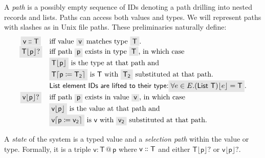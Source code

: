 \documentclass[english,submission]{programming}
\makeatletter
\newcommand{\mathbox}[1]{\colorbox{black!10}{$#1$}}
\DeclareMathOperator{\at}{\textsf{@}}
\makeatother
\begin{document}
A \textit{path} is a possibly empty sequence of IDs denoting a path drilling into nested records and lists. Paths can access both values and types. We will represent paths with slashes as in Unix file paths.
These preliminaries naturally define:
\[ \begin{array}{cl}
  \mathbox{\textsf{v} \dblcolon \textsf{T}} & \textrm{iff value \mathbox{\textsf{v}} matches type \mathbox{\textsf{T}}}.\\

  \mathbox{\textsf{T}\lfloor\textsf{p}\rfloor?} & \textrm{iff path \mathbox{\textsf{p}} exists in type \mathbox{\textsf{T}}} \textrm{, in which case}\\
  & \mathbox{\textsf{T}\lfloor\textsf{p}\rfloor} \textrm{ is the type at that path and }\\
  & \mathbox{\textsf{T}\lceil\textsf{p} \coloneqq \textsf{T}_\textsf{2}\rceil} \textrm{ is \textsf{T} with } \mathbox{\textsf{T}_\textsf{2}} \textrm{ substituted at that path.}\\
  & \textsf{List element IDs are lifted to their type:} \mathbox{\forall e \in E. (\textsf{List T})\lfloor e \rfloor = \textsf{T}}.
  \\

  \mathbox{\textsf{v}\lfloor\textsf{p}\rfloor?} &\textrm{iff path \mathbox{\textsf{p}} exists in value \mathbox{\textsf{v}}} \textrm{, in which case }\\
  & \mathbox{\textsf{v}\lfloor\textsf{p}\rfloor} \textrm{ is the value at that path and}\\
  & \mathbox{\textsf{v}\lceil\textsf{p} \coloneqq \textsf{v}_\textsf{2}\rceil} \textrm{ is \textsf{v} with } \mathbox{\textsf{v}_\textsf{2}} \textrm{ substituted at that path.}\\
\end{array}\]

A \textit{state} of the system is a typed value and a \textit{selection path} within the value or type. Formally, it is a triple \mathbox{\textsf{v} : \textsf{T} \at \textsf{p}} where \mathbox{\textsf{v} \dblcolon \textsf{T}} and either \mathbox{\textsf{T}\lfloor\textsf{p}\rfloor?} or \mathbox{\textsf{v}\lfloor\textsf{p}\rfloor?}.


\printbibliography
\end{document}
